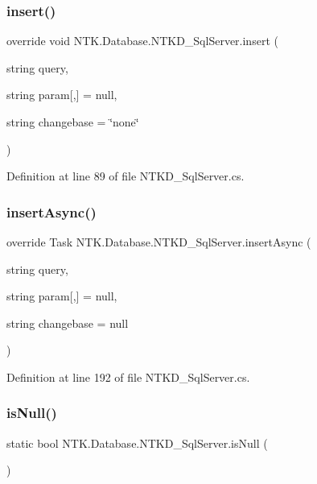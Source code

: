\subsubsection{\texorpdfstring{insert()}{insert()}}
{\footnotesize\ttfamily override void N\+T\+K.\+Database.\+N\+T\+K\+D\+\_\+\+Sql\+Server.\+insert (\begin{DoxyParamCaption}\item[{string}]{query,  }\item[{string}]{param\mbox{[},\mbox{]} = {\ttfamily null},  }\item[{string}]{changebase = {\ttfamily \char`\"{}none\char`\"{}} }\end{DoxyParamCaption})}



Definition at line 89 of file N\+T\+K\+D\+\_\+\+Sql\+Server.\+cs.

\mbox{\label{class_n_t_k_1_1_database_1_1_n_t_k_d___sql_server_a7bb00fd52c18da3bf8c5d56884626f4d}} 
\subsubsection{\texorpdfstring{insertAsync()}{insertAsync()}}
{\footnotesize\ttfamily override Task N\+T\+K.\+Database.\+N\+T\+K\+D\+\_\+\+Sql\+Server.\+insert\+Async (\begin{DoxyParamCaption}\item[{string}]{query,  }\item[{string}]{param\mbox{[},\mbox{]} = {\ttfamily null},  }\item[{string}]{changebase = {\ttfamily null} }\end{DoxyParamCaption})}



Definition at line 192 of file N\+T\+K\+D\+\_\+\+Sql\+Server.\+cs.

\mbox{\label{class_n_t_k_1_1_database_1_1_n_t_k_d___sql_server_a82b9f6ef8eaeefdb2551f36fb7d256fa}} 
\subsubsection{\texorpdfstring{isNull()}{isNull()}}
{\footnotesize\ttfamily static bool N\+T\+K.\+Database.\+N\+T\+K\+D\+\_\+\+Sql\+Server.\+is\+Null (\begin{DoxyParamCaption}{ }\end{DoxyParamCaption})\hspace{0.3cm}{\ttfamily [static]}}



